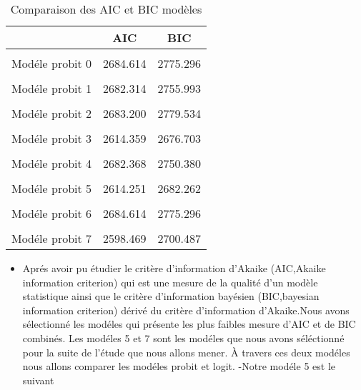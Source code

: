 \documentclass[
  14pt,
  french,
]{article}
\providecommand{\tightlist}{%
  \setlength{\itemsep}{0pt}\setlength{\parskip}{0pt}}
\begin{document}
\begin{table}[!h]

\caption{\label{tab:AIC_BIC}Comparaison des AIC et BIC modèles}
\centering
\fontsize{12}{14}\selectfont
\begin{tabular}[t]{l|c|c}
\hline
  & AIC & BIC\\
\hline
\cellcolor{gray!6}{Modéle logit 0} & \cellcolor{gray!6}{2685.494} & \cellcolor{gray!6}{2776.176}\\
\hline
Modéle probit 0 & 2684.614 & 2775.296\\
\hline
\cellcolor{gray!6}{Modéle logit 1} & \cellcolor{gray!6}{2683.492} & \cellcolor{gray!6}{2757.172}\\
\hline
Modéle probit 1 & 2682.314 & 2755.993\\
\hline
\cellcolor{gray!6}{Modéle logit 2} & \cellcolor{gray!6}{2684.144} & \cellcolor{gray!6}{2780.478}\\
\hline
Modéle probit 2 & 2683.200 & 2779.534\\
\hline
\cellcolor{gray!6}{Modéle logit 3} & \cellcolor{gray!6}{2617.711} & \cellcolor{gray!6}{2680.055}\\
\hline
Modéle probit 3 & 2614.359 & 2676.703\\
\hline
\cellcolor{gray!6}{Modéle logit 4} & \cellcolor{gray!6}{2683.627} & \cellcolor{gray!6}{2751.639}\\
\hline
Modéle probit 4 & 2682.368 & 2750.380\\
\hline
\cellcolor{gray!6}{Modéle logit 5} & \cellcolor{gray!6}{2617.647} & \cellcolor{gray!6}{2685.658}\\
\hline
Modéle probit 5 & 2614.251 & 2682.262\\
\hline
\cellcolor{gray!6}{Modéle logit 6} & \cellcolor{gray!6}{2685.494} & \cellcolor{gray!6}{2776.176}\\
\hline
Modéle probit 6 & 2684.614 & 2775.296\\
\hline
\cellcolor{gray!6}{Modéle logit 7} & \cellcolor{gray!6}{2600.871} & \cellcolor{gray!6}{2702.888}\\
\hline
Modéle probit 7 & 2598.469 & 2700.487\\
\hline
\end{tabular}
\end{table}

\begin{itemize}
\tightlist
\item
  Aprés avoir pu étudier le critère d'information d'Akaike (AIC,Akaike
  information criterion) qui est une mesure de la qualité d'un modèle
  statistique ainsi que le critère d'information bayésien (BIC,bayesian
  information criterion) dérivé du critère d'information d'Akaike.Nous
  avons sélectionné les modéles qui présente les plus faibles mesure
  d'AIC et de BIC combinés. Les modéles 5 et 7 sont les modéles que nous
  avons séléctionné pour la suite de l'étude que nous allons mener. À
  travers ces deux modéles nous allons comparer les modéles probit et
  logit. -Notre modéle 5 est le suivant
\end{itemize}
\end{document}
